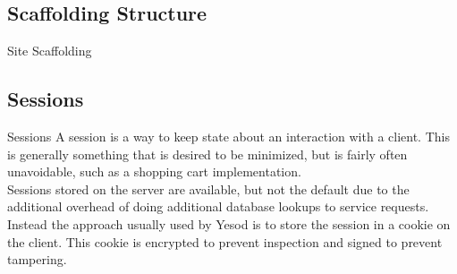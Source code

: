 \documentclass[pdf]{beamer}
\begin{document}
\subsection{Scaffolding Structure}
\begin{frame}{Site Scaffolding}
\end{frame}


\subsection{Sessions}

\begin{frame}{Sessions}
  A session is a way to keep state about an interaction with a
  client. This is generally something that is desired to be minimized,
  but is fairly often unavoidable, such as a shopping cart
  implementation. \\

  Sessions stored on the server are available, but not the default due
  to the additional overhead of doing additional database lookups to
  service requests. \\

  Instead the approach usually used by Yesod is to store the session
  in a cookie on the client. This cookie is encrypted to prevent
  inspection and signed to prevent tampering.
\end{frame}
\end{document}
